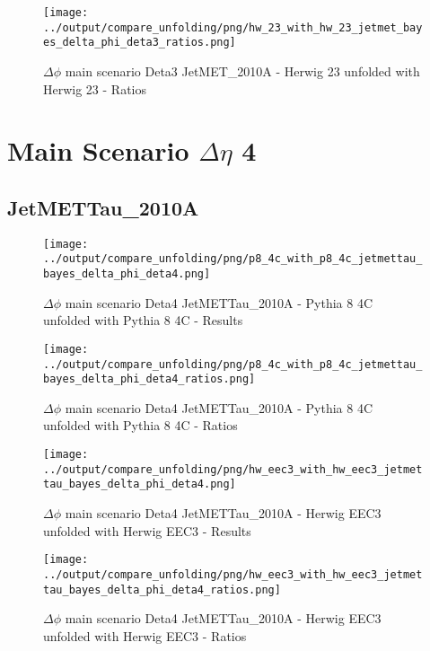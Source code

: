 \documentclass[11pt]{book}
\begin{document}
\begin{figure}[ht]
\centering
\texttt{[image: ../output/compare\_unfolding/png/hw\_23\_with\_hw\_23\_jetmet\_bayes\_delta\_phi\_deta3\_ratios.png]}
\caption{$\Delta\phi$ main scenario Deta3 JetMET\_2010A - Herwig 23 unfolded with Herwig 23 - Ratios}
\label{hw_23_hw_23_jetmet_bayes_delta_phi_deta3_b}
\end{figure}


\newpage
\chapter{Main Scenario $\Delta\eta$ 4 }
\section{JetMETTau\_2010A}

\begin{figure}[ht]
\centering
\texttt{[image: ../output/compare\_unfolding/png/p8\_4c\_with\_p8\_4c\_jetmettau\_bayes\_delta\_phi\_deta4.png]}
\caption{$\Delta\phi$ main scenario Deta4 JetMETTau\_2010A - Pythia 8 4C unfolded with Pythia 8 4C - Results}
\label{p8_p8_jetmettau_bayes_delta_phi_deta4_a}
\end{figure}

\begin{figure}[ht]
\centering
\texttt{[image: ../output/compare\_unfolding/png/p8\_4c\_with\_p8\_4c\_jetmettau\_bayes\_delta\_phi\_deta4\_ratios.png]}
\caption{$\Delta\phi$ main scenario Deta4 JetMETTau\_2010A - Pythia 8 4C unfolded with Pythia 8 4C - Ratios}
\label{p8_p8_jetmettau_bayes_delta_phi_deta4_b}
\end{figure}

\begin{figure}[ht]
\centering
\texttt{[image: ../output/compare\_unfolding/png/hw\_eec3\_with\_hw\_eec3\_jetmettau\_bayes\_delta\_phi\_deta4.png]}
\caption{$\Delta\phi$ main scenario Deta4 JetMETTau\_2010A - Herwig EEC3 unfolded with Herwig EEC3 - Results}
\label{hw_eec3_hw_eec3_jetmettau_bayes_delta_phi_deta4_a}
\end{figure}

\begin{figure}[ht]
\centering
\texttt{[image: ../output/compare\_unfolding/png/hw\_eec3\_with\_hw\_eec3\_jetmettau\_bayes\_delta\_phi\_deta4\_ratios.png]}
\caption{$\Delta\phi$ main scenario Deta4 JetMETTau\_2010A - Herwig EEC3 unfolded with Herwig EEC3 - Ratios}
\label{hw_eec3_hw_eec3_jetmettau_bayes_delta_phi_deta4_b}
\end{figure}
\end{document}
